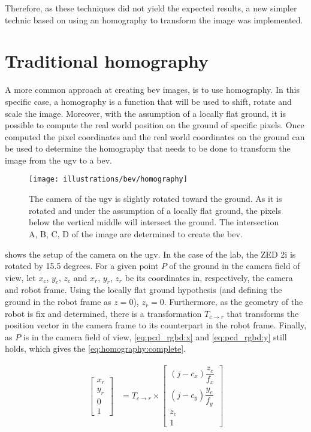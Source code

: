Therefore, as these techniques did not yield the expected results, a new simpler technic based on using an homography to
transform the image was implemented.


\section{Traditional homography}

A more common approach at creating \gls{bev} images, is to use homography.
In this specific case, a homography is a function that will be used to shift, rotate and scale the image.
Moreover, with the assumption of a locally flat ground, it is possible to compute the real world
position on the ground of specific pixels.
Once computed the pixel coordinates and the real world coordinates on the ground can be used to determine the
homography that needs to be done to transform the image from the \gls{ugv} to a \gls{bev}.

\begin{figure}[ht!]
    \centering
    \texttt{[image: illustrations/bev/homography]}
    \caption{The camera of the \gls{ugv} is slightly rotated toward the ground. As it is rotated and under
    the assumption of a locally flat ground, the pixels below the vertical middle will intersect the ground.
    The intersection A, B, C, D of the image are determined to create the \gls{bev}.}
    \label{fig:homography:homography}
\end{figure}


 shows the setup of the camera on the \gls{ugv}.
In the case of the lab, the ZED 2i is rotated by 15.5 degrees.
For a given point $P$ of the ground in the camera field of view, let $x_c$, $y_c$, $z_c$ and $x_r$, $y_r$, $z_r$ be its
coordinates in, respectively, the camera and robot frame.
Using the locally flat ground hypothesis (and defining the ground in the robot frame as $z=0$), $z_r = 0$.
Furthermore, as the geometry of the robot is fix and determined, there is a transformation $T_{c\rightarrow r}$ that
transforms the position vector in the camera frame to its counterpart in the robot frame.
Finally, as $P$ is in the camera field of view, \cref{eq:pcd_rgbd:x} and \cref{eq:pcd_rgbd:y} still holds, which gives
the \cref{eq:homography:complete}.

\begin{align}
    \label{eq:homography:complete}
    \begin{bmatrix}
        x_r \\
        y_r \\
        0   \\
        1
    \end{bmatrix} &= T_{c\rightarrow r} \times
    \begin{bmatrix}
    (j - c_x)
        \dfrac{z_c}{f_x}\\
        (j - c_y) \dfrac{y_c}{f_y} \\
        z_c                        \\
        1
    \end{bmatrix}
\end{align}

